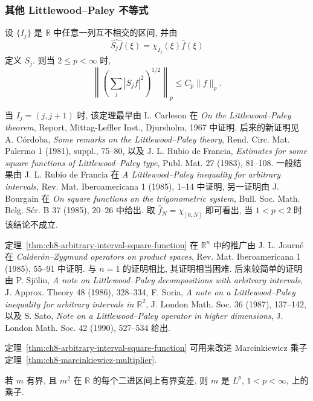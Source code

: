 \hypertarget{chapter-08-page-197}{}
\subsubsection{其他 Littlewood--Paley 不等式}
\label{subsec:ch8-other-littlewood-paley}

\begin{Theorem}
\label{thm:ch8-arbitrary-interval-square-function}
设 $\{I_j\}$ 是 $\mathbb R$ 中任意一列互不相交的区间, 并由
\[
 \widehat{S_jf}(\xi)=\chi_{I_j}(\xi)\widehat f(\xi)
\]
定义 $S_j$. 则当 $2\le p<\infty$ 时,
\[
 \left\|\left(\sum_j|S_jf|^2\right)^{1/2}\right\|_p
 \le C_p\|f\|_p.
\]
\end{Theorem}

当 $I_j=(j,j+1)$ 时, 该定理最早由 L. Carleson 在 \textit{On the Littlewood--Paley theorem}, Report, Mittag-Leffler Inst., Djursholm, 1967 中证明. 后来的新证明见 A. Córdoba, \textit{Some remarks on the Littlewood--Paley theory}, Rend. Circ. Mat. Palermo 1 (1981), suppl., 75--80, 以及 J. L. Rubio de Francia, \textit{Estimates for some square functions of Littlewood--Paley type}, Publ. Mat. 27 (1983), 81--108. 一般结果由 J. L. Rubio de Francia 在 \textit{A Littlewood--Paley inequality for arbitrary intervals}, Rev. Mat. Iberoamericana 1 (1985), 1--14 中证明, 另一证明由 J. Bourgain 在 \textit{On square functions on the trigonometric system}, Bull. Soc. Math. Belg. Sér. B 37 (1985), 20--26 中给出. 取 $\widehat f_N=\chi_{[0,N]}$ 即可看出, 当 $1<p<2$ 时该结论不成立.

定理~\ref{thm:ch8-arbitrary-interval-square-function} 在 $\mathbb R^n$ 中的推广由 J. L. Journé 在 \textit{Calderón--Zygmund operators on product spaces}, Rev. Mat. Iberoamericana 1 (1985), 55--91 中证明. 与 $n=1$ 的证明相比, 其证明相当困难. 后来较简单的证明由 P. Sjölin, \textit{A note on Littlewood--Paley decompositions with arbitrary intervals}, J. Approx. Theory 48 (1986), 328--334, F. Soria, \textit{A note on a Littlewood--Paley inequality for arbitrary intervals in $\mathbb R^2$}, J. London Math. Soc. 36 (1987), 137--142, 以及 S. Sato, \textit{Note on a Littlewood--Paley operator in higher dimensions}, J. London Math. Soc. 42 (1990), 527--534 给出.

定理~\ref{thm:ch8-arbitrary-interval-square-function} 可用来改进 Marcinkiewicz 乘子定理~\ref{thm:ch8-marcinkiewicz-multiplier}.

\hypertarget{chapter-08-page-198}{}
\begin{Theorem}
\label{thm:ch8-square-bounded-variation-multiplier}
若 $m$ 有界, 且 $m^2$ 在 $\mathbb R$ 的每个二进区间上有界变差, 则 $m$ 是 $L^p$, $1<p<\infty$, 上的乘子.
\end{Theorem}

